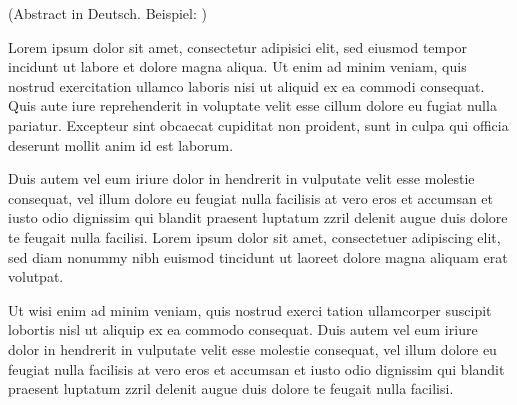 (Abstract in Deutsch. Beispiel: \cite{loremIpsum})

Lorem ipsum dolor sit amet, consectetur adipisici elit, sed eiusmod tempor
incidunt ut labore et dolore magna aliqua. Ut enim ad minim veniam, quis
nostrud exercitation ullamco laboris nisi ut aliquid ex ea commodi consequat.
Quis aute iure reprehenderit in voluptate velit esse cillum dolore eu fugiat
nulla pariatur. Excepteur sint obcaecat cupiditat non proident, sunt in culpa
qui officia deserunt mollit anim id est laborum.

Duis autem vel eum iriure dolor in hendrerit in vulputate velit esse molestie
consequat, vel illum dolore eu feugiat nulla facilisis at vero eros et
accumsan et iusto odio dignissim qui blandit praesent luptatum zzril delenit
augue duis dolore te feugait nulla facilisi. Lorem ipsum dolor sit amet,
consectetuer adipiscing elit, sed diam nonummy nibh euismod tincidunt ut
laoreet dolore magna aliquam erat volutpat.

Ut wisi enim ad minim veniam, quis nostrud exerci tation ullamcorper suscipit
lobortis nisl ut aliquip ex ea commodo consequat. Duis autem vel eum iriure
dolor in hendrerit in vulputate velit esse molestie consequat, vel illum dolore
eu feugiat nulla facilisis at vero eros et accumsan et iusto odio dignissim qui
blandit praesent luptatum zzril delenit augue duis dolore te feugait nulla
facilisi.
